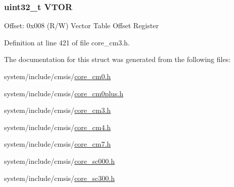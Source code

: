 \subsubsection[{\texorpdfstring{V\+T\+OR}{VTOR}}]{ uint32\+\_\+t V\+T\+OR}\hypertarget{struct_s_c_b___type_ae457d2615e203c3d5904a43a1bc9df71}{}\label{struct_s_c_b___type_ae457d2615e203c3d5904a43a1bc9df71}
Offset\+: 0x008 (R/W) Vector Table Offset Register 

Definition at line 421 of file core\+\_\+cm3.\+h.



The documentation for this struct was generated from the following files\+:\begin{DoxyCompactItemize}
\item 
system/include/cmsis/\hyperlink{core__cm0_8h}{core\+\_\+cm0.\+h}\item 
system/include/cmsis/\hyperlink{core__cm0plus_8h}{core\+\_\+cm0plus.\+h}\item 
system/include/cmsis/\hyperlink{core__cm3_8h}{core\+\_\+cm3.\+h}\item 
system/include/cmsis/\hyperlink{core__cm4_8h}{core\+\_\+cm4.\+h}\item 
system/include/cmsis/\hyperlink{core__cm7_8h}{core\+\_\+cm7.\+h}\item 
system/include/cmsis/\hyperlink{core__sc000_8h}{core\+\_\+sc000.\+h}\item 
system/include/cmsis/\hyperlink{core__sc300_8h}{core\+\_\+sc300.\+h}\end{DoxyCompactItemize}
